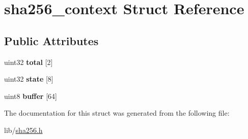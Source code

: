 \hypertarget{structsha256__context}{\section{sha256\-\_\-context Struct Reference}
\label{structsha256__context}
}
\subsection*{Public Attributes}
\begin{DoxyCompactItemize}
\item 
\hypertarget{structsha256__context_afdc00cba5ee75ffd2c1504e09e4c97c8}{uint32 {\bfseries total} \mbox{[}2\mbox{]}}\label{structsha256__context_afdc00cba5ee75ffd2c1504e09e4c97c8}

\item 
\hypertarget{structsha256__context_a7d05894c9a5704c1e91eb3c024478051}{uint32 {\bfseries state} \mbox{[}8\mbox{]}}\label{structsha256__context_a7d05894c9a5704c1e91eb3c024478051}

\item 
\hypertarget{structsha256__context_a525f6728ca2bc22c10223e249fcf566b}{uint8 {\bfseries buffer} \mbox{[}64\mbox{]}}\label{structsha256__context_a525f6728ca2bc22c10223e249fcf566b}

\end{DoxyCompactItemize}


The documentation for this struct was generated from the following file\-:\begin{DoxyCompactItemize}
\item 
lib/\hyperlink{sha256_8h}{sha256.\-h}\end{DoxyCompactItemize}

